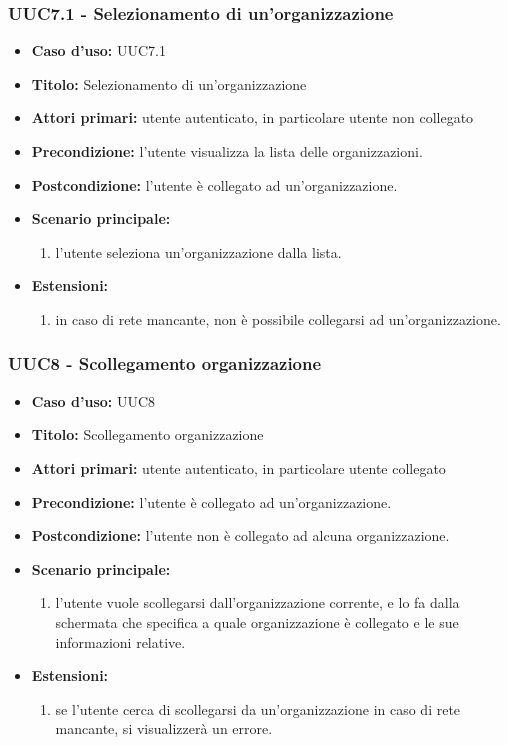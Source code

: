 \documentclass[casi-duso]{subfiles}
\begin{document}
\subsubsection{UUC7.1 - Selezionamento di un'organizzazione}
\label{subsub:UUC7utente}
\begin{itemize}
  \item \textbf{Caso d’uso:} UUC7.1
  \item \textbf{Titolo:} Selezionamento di un'organizzazione
  \item \textbf{Attori primari:} utente autenticato, in particolare utente non collegato
  \item \textbf{Precondizione:} l'utente visualizza la lista delle organizzazioni.
  \item \textbf{Postcondizione:} l'utente è collegato ad un'organizzazione.
  \item \textbf{Scenario principale:} 
  \begin{enumerate}
    \item l'utente seleziona un'organizzazione dalla lista.
  \end{enumerate}  
  \item \textbf{Estensioni:} 
  \begin{enumerate}
    \item in caso di rete mancante, non è possibile collegarsi ad un'organizzazione.
  \end{enumerate}  
\end{itemize}

\subsubsection{UUC8 - Scollegamento organizzazione}
\label{subsub:UUC8utente}
\begin{itemize}
  \item \textbf{Caso d’uso:} UUC8
  \item \textbf{Titolo:} Scollegamento organizzazione
  \item \textbf{Attori primari:} utente autenticato, in particolare utente collegato
  \item \textbf{Precondizione:} l'utente è collegato ad un'organizzazione.
  \item \textbf{Postcondizione:} l'utente non è collegato ad alcuna organizzazione.
  \item \textbf{Scenario principale:} 
  \begin{enumerate}
    \item l'utente vuole scollegarsi dall'organizzazione corrente, e lo fa dalla schermata che specifica a quale organizzazione è collegato e le 
    sue informazioni relative.
  \end{enumerate}  
  \item \textbf{Estensioni:} 
  \begin{enumerate}
    \item se l'utente cerca di scollegarsi da un'organizzazione in caso di rete mancante, si visualizzerà un errore.
  \end{enumerate}  
\end{itemize}
\end{document}
